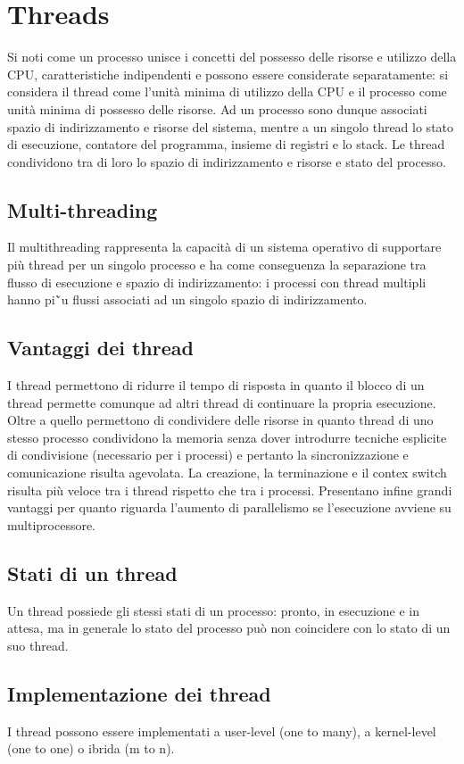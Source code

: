 \section{Threads}
Si noti come un processo unisce i concetti del possesso delle risorse e utilizzo della CPU, caratteristiche indipendenti e possono essere considerate separatamente: si considera il 
thread come l'unit\`a minima di utilizzo della CPU e il processo come unit\`a minima di possesso delle risorse. Ad un processo sono dunque associati spazio di indirizzamento e risorse
del sistema, mentre a un singolo thread lo stato di esecuzione, contatore del programma, insieme di registri e lo stack. Le thread condividono tra di loro lo spazio di indirizzamento e
risorse e stato del processo.
\subsection{Multi-threading}
Il multithreading rappresenta la capacit\`a di un sistema operativo di supportare pi\`u thread per un singolo processo e ha come conseguenza la separazione tra flusso di esecuzione e 
spazio di indirizzamento: i processi con thread multipli hanno pi\u`u flussi associati ad un singolo spazio di indirizzamento. 
\subsection{Vantaggi dei thread}
I thread permettono di ridurre il tempo di risposta in quanto il blocco di un thread permette comunque ad altri thread di continuare la propria esecuzione. Oltre a quello permettono
di condividere delle risorse in quanto thread di uno stesso processo condividono la memoria senza dover introdurre tecniche esplicite di condivisione (necessario per i processi) e 
pertanto la sincronizzazione e comunicazione risulta agevolata. La creazione, la terminazione e il contex switch risulta pi\`u veloce tra i thread rispetto che tra i processi. 
Presentano infine grandi vantaggi per quanto riguarda l'aumento di parallelismo se l'esecuzione avviene su multiprocessore. 
\subsection{Stati di un thread}
Un thread possiede gli stessi stati di un processo: pronto, in esecuzione e in attesa, ma in generale lo stato del processo pu\`o non coincidere con lo stato di un suo thread.
\subsection{Implementazione dei thread}
I thread possono essere implementati a user-level (one to many), a kernel-level (one to one) o ibrida (m to n).

